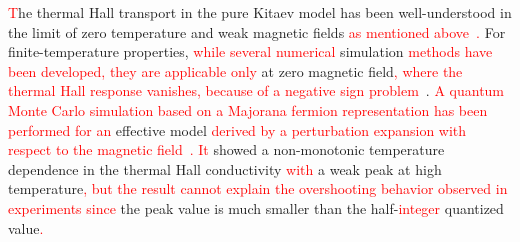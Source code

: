 \documentclass[twocolumn,superscriptaddress,showpacs, longbibliography, aps, prb]{revtex4-2}
\newcommand{\red}[1]{\textcolor{red}{#1}}
\newcommand{\blue}[1]{\textcolor{blue}{#1}}
\begin{document}
\red{T}he thermal Hall transport in the pure Kitaev model has been well-understood 
in the limit of zero temperature 
and weak magnetic fields \red{as mentioned above~\cite{Kitaev2006}.} %
For finite-temperature properties, %
\red{while several numerical} simulation \red{methods %
have been developed, they are applicable only} 
at zero magnetic field\red{, %
where the thermal Hall response vanishes, because of a negative sign problem~\cite{NasuUM2014,NasuUM2015,YoshitakeNM2016,YoshitakeNKM2017,YoshitakeNM2017, YoshitakeNKM2020}}. 
\red{A quantum Monte Carlo simulation based on a Majorana fermion representation has been performed for an} effective model \red{derived by a perturbation expansion with respect to the magnetic field~\cite{NasuYM2017}. 
It} showed a non-monotonic temperature dependence 
in the thermal Hall conductivity %
\red{with} a weak peak at high temperature\red{, %
but the result cannot explain the overshooting behavior observed in experiments since} the peak value is much smaller than the half-\red{integer} quantized value\red{.} %
\end{document}
